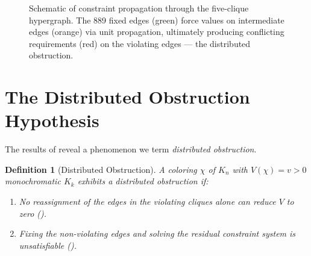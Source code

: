 \documentclass[11pt,a4paper]{article}
\theoremstyle{plain}
\newtheorem{definition}[theorem]{Definition}
\theoremstyle{remark}
\begin{document}
\begin{figure}[H]
\caption{Schematic of constraint propagation through the five-clique
  hypergraph. The 889 fixed edges (green) force values on intermediate
  edges (orange) via unit propagation, ultimately producing conflicting
  requirements (red) on the violating edges --- the distributed
  obstruction.}
\label{fig:propagation}
\end{figure}

\section{The Distributed Obstruction Hypothesis}
\label{sec:hypothesis}

The results of  reveal a phenomenon we term
\emph{distributed obstruction}.

\begin{definition}[Distributed Obstruction]
A coloring $\chi$ of $K_n$ with $V(\chi) = v > 0$ monochromatic
$K_k$ exhibits a \emph{distributed obstruction} if:
\begin{enumerate}[leftmargin=2em]
  \item No reassignment of the edges in the violating cliques alone
    can reduce $V$ to zero ().
  \item Fixing the non-violating edges and solving the residual
    constraint system is unsatisfiable ().
\end{enumerate}
\end{definition}
\end{document}
